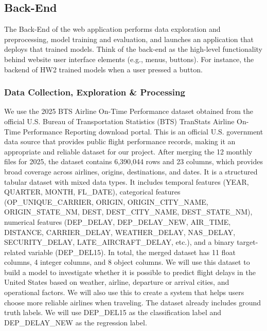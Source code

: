 
\subsection{Back-End}

The Back-End of the web application performs data exploration and preprocessing, model training and evaluation, and launches an application that deploys that trained models. Think of the back-end as the high-level functionality behind website user interface elements (e.g., menus, buttons). For instance, the backend of HW2 trained models when a user pressed a button.

\subsubsection{Data Collection, Exploration \& Processing} 

We use the 2025 BTS Airline On-Time Performance dataset obtained from the official U.S. Bureau of Transportation Statistics (BTS) TranStats Airline On-Time Performance Reporting download portal. This is an official U.S. government data source that provides public flight performance records, making it an appropriate and reliable dataset for our project. After merging the 12 monthly files for 2025, the dataset contains 6,390,044 rows and 23 columns, which provides broad coverage across airlines, origins, destinations, and dates. It is a structured tabular dataset with mixed data types. It includes temporal features (YEAR, QUARTER, MONTH, FL\_DATE), categorical features (OP\_UNIQUE\_CARRIER, ORIGIN, ORIGIN\_CITY\_NAME, ORIGIN\_STATE\_NM, DEST, DEST\_CITY\_NAME, DEST\_STATE\_NM), numerical features (DEP\_DELAY, DEP\_DELAY\_NEW, AIR\_TIME, DISTANCE, CARRIER\_DELAY, WEATHER\_DELAY, NAS\_DELAY, SECURITY\_DELAY, LATE\_AIRCRAFT\_DELAY, etc.), and a binary target-related variable (DEP\_DEL15). In total, the merged dataset has 11 float columns, 4 integer columns, and 8 object columns. We will use this dataset to build a model to investigate whether it is possible to predict flight delays in the United States based on weather, airline, departure or arrival cities, and operational factors. We will also use this to create a system that helps users choose more reliable airlines when traveling. The dataset already includes ground truth labels. We will use DEP\_DEL15 as the classification label and DEP\_DELAY\_NEW as the regression label.

